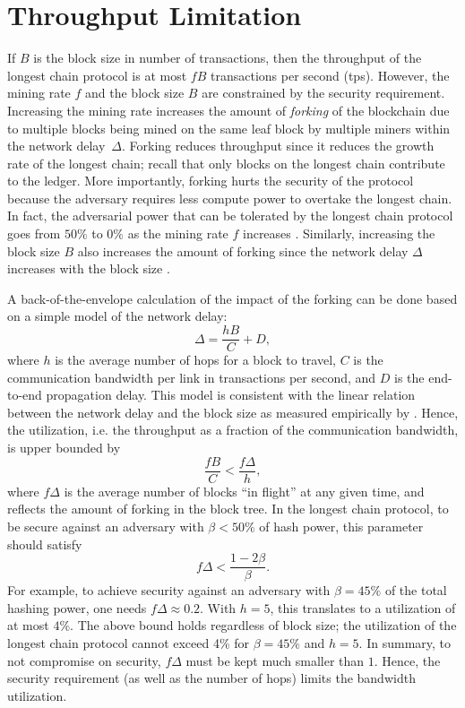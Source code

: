 \section{Throughput Limitation}
\label{s:lc-thput}

If $B$ is the block size in number of transactions, then the throughput of the longest chain protocol is at most $fB$ transactions per second (tps). 
However, the mining rate $f$ and the block size $B$ are constrained by the security requirement. Increasing the mining rate increases the amount of {\em forking} of the blockchain due to multiple blocks being mined on the same leaf block by multiple miners within the network delay~$\Delta$. Forking reduces throughput since it reduces the growth rate of the longest chain; recall that only blocks on the longest chain contribute to the ledger. More importantly, forking hurts the security of the protocol because the adversary requires less compute power to overtake the longest chain. In fact, the adversarial power that can be tolerated by the longest chain protocol goes from $50\%$ to $0\%$ as the mining rate $f$ increases \cite{backbone}. 
Similarly, increasing the block size $B$ also increases the amount of forking since the network delay $\Delta$ increases with the block size \cite{decker}.

A back-of-the-envelope calculation of the impact of the forking can be done based on a simple model of the network delay: 
$$ \Delta = \frac{hB}{C} + D,$$
where $h$ is the average number of hops for a block to travel, $C$ is the communication bandwidth per link in transactions per second, and $D$ is the end-to-end propagation delay.  This model is consistent with the linear relation between the network delay and the block size as measured empirically by \cite{decker}. 
Hence, the utilization, i.e. the throughput as a fraction of the communication bandwidth, is upper bounded by
$$ \frac{fB}{C} < \frac{f\Delta}{h},$$
where $f\Delta$ is the average number of blocks ``in flight'' at any given time, and reflects the amount of forking in the block tree.  %
In the longest chain protocol, to be secure against an adversary with $\beta < 50\%$ of hash power, this parameter should satisfy \cite{backbone}
$$f\Delta<\frac{1-2\beta}{\beta}.$$
For example, to achieve security against an adversary with $\beta = 45\%$ of the total hashing power, one needs $f\Delta \approx 0.2$. With $h = 5$, this translates to a utilization of at most $4\%$. The above bound holds regardless of block size; the utilization of the longest chain protocol cannot exceed 4\% for $\beta = 45\%$ and $h=5$.
In summary, to not compromise on security, $f\Delta$ must be kept much smaller than $1$. 
Hence, the security requirement (as well as the number of hops) limits the bandwidth utilization.  


